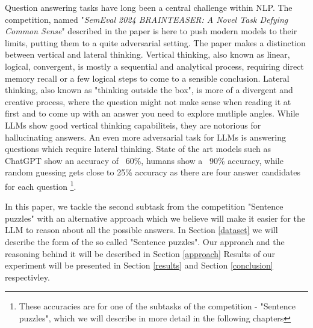 Question answering tasks have long been a central challenge within NLP.  The competition, named 
"\textit{SemEval 2024 BRAINTEASER: A Novel Task Defying Common Sense}" described in the paper 
\citep{semeval} is here to push modern models to their limits, putting
them to a quite adversarial setting.  The paper makes a distinction between vertical and lateral
thinking.  Vertical thinking, also known as linear, logical, convergent, is mostly a sequential and 
analytical process, requiring direct memory recall or a few logical steps to come to a sensible 
conclusion. Lateral thinking, also known as "thinking outside the box", is more of a divergent
and creative process, where the question might not make sense when reading it at first and to come
up with an answer you need to explore mutliple angles.  While LLMs show good vertical thinking 
capabiliteis, they are notorious for hallucinating answers. An even more adversarial task for
LLMs is answering questions which require lateral thinking.  State of the art models such as 
ChatGPT show an accuracy of ~60\%, humans show a ~90\% accuracy, while random 
guessing gets close to 25\% accuracy as there are four answer candidates for each question
\footnote[1]{These accuracies are
for one of the subtasks of the competition - "Sentence puzzles", which we will describe in more
detail in the following chapters}.

In this paper, we tackle the second subtask from the competition "Sentence puzzles" with an
alternative approach which we believe will make it easier for the LLM to reason about all the
possible answers. In Section \ref{dataset} we will describe the form of the so called 
"Sentence puzzles".  Our approach and the reasoning behind it will be described in Section 
\ref{approach}  Results of our experiment will be presented in Section \ref{results} and 
Section \ref{conclusion} respectivley.


